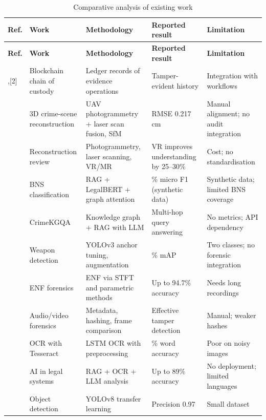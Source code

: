 \documentclass[12pt,a4paper,oneside]{report}
\begin{document}
{\footnotesize
\setlength{\tabcolsep}{3pt}
\renewcommand{\arraystretch}{1.15}
\begin{longtable}{|>{\raggedright\arraybackslash}p{1.33cm}|>{\raggedright\arraybackslash}p{2.84cm}|>{\raggedright\arraybackslash}p{3.79cm}|>{\raggedright\arraybackslash}p{3.03cm}|>{\raggedright\arraybackslash}p{3.22cm}|}
\caption{Comparative analysis of existing work}\\
\hline
\rowcolor{headfill}\textbf{Ref.} & \textbf{Work} & \textbf{Methodology} & \textbf{Reported result} & \textbf{Limitation} \\ \hline
\endfirsthead
\hline
\rowcolor{headfill}\textbf{Ref.} & \textbf{Work} & \textbf{Methodology} & \textbf{Reported result} & \textbf{Limitation} \\ \hline
\endhead
\hline \endfoot
[1],[2] & Blockchain chain of custody & Ledger records of evidence operations & Tamper-evident history & Integration with workflows \\ \hline
[3] & 3D crime-scene reconstruction & UAV photogrammetry + laser scan fusion, SfM & RMSE 0.217 cm & Manual alignment; no audit integration \\ \hline
[4] & Reconstruction review & Photogrammetry, laser scanning, VR/MR & VR improves understanding by 25--30\% & Cost; no standardisation \\ \hline
[5] & BNS classification & RAG + LegalBERT + graph attention & 98.71\% micro F1 (synthetic data) & Synthetic data; limited BNS coverage \\ \hline
[6] & CrimeKGQA & Knowledge graph + RAG with LLM & Multi-hop query answering & No metrics; API dependency \\ \hline
[7] & Weapon detection & YOLOv3 anchor tuning, augmentation & 90.20\% mAP & Two classes; no forensic integration \\ \hline
[8] & ENF forensics & ENF via STFT and parametric methods & Up to 94.7\% accuracy & Needs long recordings \\ \hline
[9] & Audio/video forensics & Metadata, hashing, frame comparison & Effective tamper detection & Manual; weaker hashes \\ \hline
[10] & OCR with Tesseract & LSTM OCR with preprocessing & 96.87\% word accuracy & Poor on noisy images \\ \hline
[11] & AI in legal systems & RAG + OCR + LLM analysis & Up to 89\% accuracy & No deployment; limited languages \\ \hline
[12] & Object detection & YOLOv8 transfer learning & Precision 0.97 & Small dataset \\ \hline
\end{longtable}
}
\end{document}
